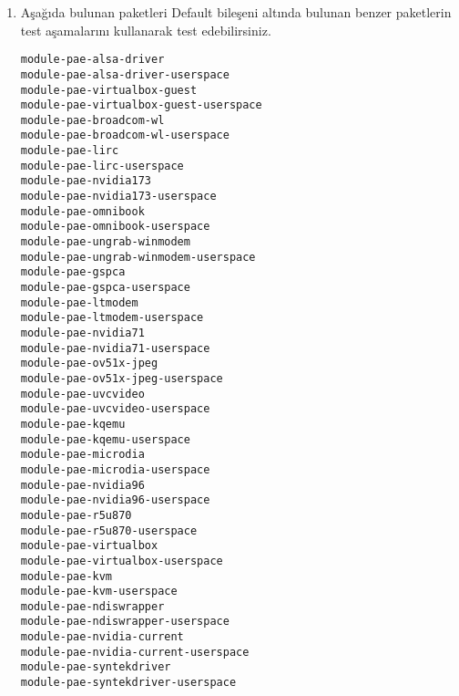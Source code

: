 \documentclass[a4paper,10pt]{article}
\begin{document}
\begin{enumerate}
\item Aşağıda bulunan paketleri Default bileşeni altında bulunan benzer paketlerin test aşamalarını kullanarak test edebilirsiniz.

\begin{verbatim}
module-pae-alsa-driver
module-pae-alsa-driver-userspace
module-pae-virtualbox-guest
module-pae-virtualbox-guest-userspace
module-pae-broadcom-wl
module-pae-broadcom-wl-userspace
module-pae-lirc
module-pae-lirc-userspace
module-pae-nvidia173
module-pae-nvidia173-userspace
module-pae-omnibook
module-pae-omnibook-userspace
module-pae-ungrab-winmodem
module-pae-ungrab-winmodem-userspace
module-pae-gspca
module-pae-gspca-userspace
module-pae-ltmodem
module-pae-ltmodem-userspace
module-pae-nvidia71
module-pae-nvidia71-userspace
module-pae-ov51x-jpeg
module-pae-ov51x-jpeg-userspace
module-pae-uvcvideo
module-pae-uvcvideo-userspace
module-pae-kqemu
module-pae-kqemu-userspace
module-pae-microdia
module-pae-microdia-userspace
module-pae-nvidia96
module-pae-nvidia96-userspace
module-pae-r5u870
module-pae-r5u870-userspace
module-pae-virtualbox
module-pae-virtualbox-userspace
module-pae-kvm
module-pae-kvm-userspace
module-pae-ndiswrapper
module-pae-ndiswrapper-userspace
module-pae-nvidia-current
module-pae-nvidia-current-userspace
module-pae-syntekdriver   
module-pae-syntekdriver-userspace

\end{verbatim}
\end{enumerate}
\end{document}
